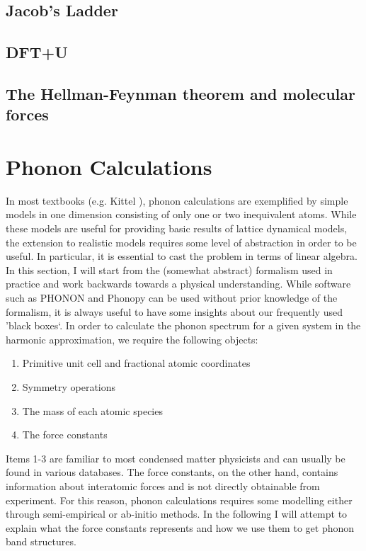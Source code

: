 \subsection{Jacob's Ladder}

\subsection{DFT+U}\label{sec:ldau}

\subsection{The Hellman-Feynman theorem and molecular forces}

\section{Phonon Calculations}
In most textbooks (e.g. Kittel \cite{Kittel2005}), phonon calculations are exemplified by simple models in one dimension consisting of only one or two inequivalent atoms. While these models are useful for providing basic results of lattice dynamical models, the extension to realistic models requires some level of abstraction in order to be useful. In particular, it is essential to cast the problem in terms of linear algebra. In this section, I will start from the (somewhat abstract) formalism used in practice and work backwards towards a physical understanding. While software such as PHONON \cite{Parlinski1997} and Phonopy \cite{Togo2015} can be used without prior knowledge of the formalism, it is always useful to have some insights about our frequently used 'black boxes`. In order to calculate the phonon spectrum for a given system in the harmonic approximation, we require the following objects:

\begin{enumerate}
	\item Primitive unit cell and fractional atomic coordinates
	\item Symmetry operations
	\item The mass of each atomic species
	\item The force constants
\end{enumerate}

Items 1-3 are familiar to most condensed matter physicists and can usually be found in various databases. The force constants, on the other hand, contains information about interatomic forces and is not directly obtainable from experiment. For this reason, phonon calculations requires some modelling either through semi-empirical or ab-initio methods. In the following I will attempt to explain what the force constants represents and how we use them to get phonon band structures.

